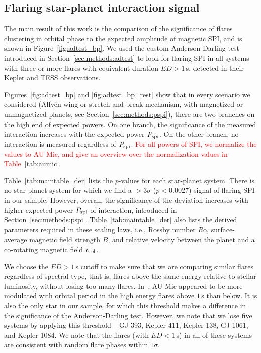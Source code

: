 \documentclass[twocolumn]{aastex631}
\begin{document}
\subsection{Flaring star-planet interaction signal}
\label{sec:results:spi}
The main result of this work is the comparison of the significance of flares clustering in orbital phase to the expected amplitude of magnetic SPI, and is shown in Figure~\ref{fig:adtest_bp}. We used the custom Anderson-Darling test introduced in Section~\ref{sec:methods:adtest} to look for flaring SPI in all systems with three or more flares with equivalent duration $ED>1\,$s, detected in their Kepler and TESS observations. 

Figures~\ref{fig:adtest_bp} and \ref{fig:adtest_bp_rest} show that in every scenario we considered (Alfv\'en wing or stretch-and-break mechanism, with magnetized or unmagnetized planets, see Section~\ref{sec:methods:pspi}), there are two branches on the high end of expected powers. On one branch, the significance of the measured interaction increases with the expected power $P_{\rm spi}$. On the other branch, no interaction is measured regardless of $P_{\rm spi}$. \textcolor{red}{For all powers of SPI, we normalize the values to AU Mic, and give an overview over the normalization values in Table~\ref{tab:aumic}}.

Table~\ref{tab:maintable_der} lists the $p$-values for each star-planet system. There is no star-planet system for which we find a $>3\sigma$ ($p<0.0027$) signal of flaring SPI in our sample. However, overall, the significance of the deviation increases with higher expected power $P_{\rm spi}$ of interaction, introduced in Section~\ref{sec:methods:pspi}. Table~\ref{tab:maintable_der} also lists the derived parameters required in these scaling laws, i.e., Rossby number $R$o, surface-average magnetic field strength $B$, and relative velocity between the planet and a co-rotating magnetic field $v_{\rm rel}$. 

We choose the $ED>1\,$s cutoff to make sure that we are comparing similar flares regardless of spectral type, that is, flares above the same energy relative to stellar luminosity, without losing too many flares. In~\citet{ilin2022searching}, AU Mic appeared to be more modulated with orbital period in the high energy flares above $1\,$s than below. It is also the only star in our sample, for which this threshold makes a difference in the significance of the Anderson-Darling test. However, we note that we lose five systems by applying this threshold -- GJ 393, Kepler-411, Kepler-138, GJ 1061, and Kepler-1084. We note that the flares (with $ED<1\,$s) in all of these systems are consistent with random flare phases within $1\sigma$.
\end{document}
